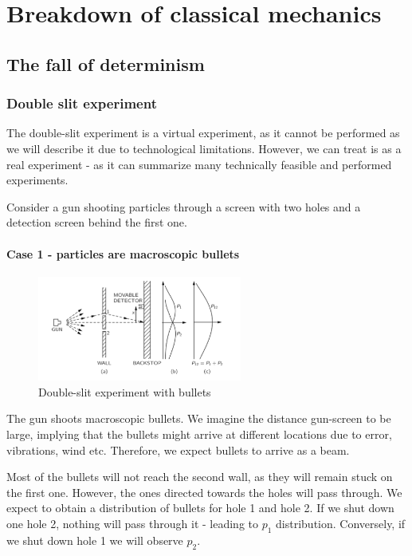 \graphicspath{{chapters/02/}}
\chapter{Breakdown of classical mechanics}

\section{The fall of determinism}

  \subsection{Double slit experiment}
  The double-slit experiment is a virtual experiment, as it cannot be performed as we will describe it due to technological limitations. However, we can treat is as a real experiment - as it can summarize many technically feasible and performed experiments.
  
 Consider a gun shooting particles through a screen with two holes and a detection screen behind the first one.
 
  \subsubsection{Case 1 - particles are macroscopic bullets}
  
  \begin{figure}[h!]
    \centering
    \includegraphics[clip, trim= 0.5cm 0.7cm 0.5cm 1cm, width=0.6\textwidth]{gun_ds.png}
    \caption{\label{fig:gun_ds} Double-slit experiment with bullets}
\end{figure}

  The gun shoots macroscopic bullets. We imagine the distance gun-screen to be large, implying that the bullets might arrive at different locations due to error, vibrations, wind etc. Therefore, we expect bullets to arrive as a beam.

  Most of the bullets will not reach the second wall, as they will remain stuck on the first one. However, the ones directed towards the holes will pass through. We expect to obtain a distribution of bullets for hole 1 and hole 2. If we shut down one hole 2, nothing will pass through it - leading to $p_1$ distribution. Conversely, if we shut down hole 1 we will observe $p_2$.
  
